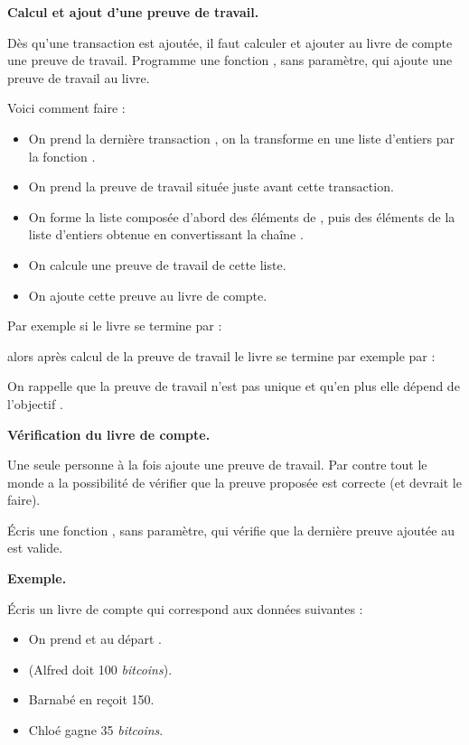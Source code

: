 \documentclass[12pt,class=report,crop=false]{standalone}
\begin{document}
\begin{enumerate}
 
\newpage

 \textbf{Calcul et ajout d'une preuve de travail.}  

Dès qu'une transaction est ajoutée, il faut calculer et ajouter au livre de compte une preuve de travail. Programme une fonction , sans paramètre, qui ajoute une preuve de travail au livre.   
   
Voici comment faire :
  \begin{itemize}
    \item On prend la dernière transaction , on la transforme en une liste d'entiers par la fonction .
    \item On prend la preuve de travail  située juste avant cette transaction.
    \item On forme la liste  composée d'abord des éléments de , puis des éléments de la liste d'entiers obtenue en convertissant la chaîne .
    \item On calcule une preuve de travail de cette liste.
    \item  On ajoute cette preuve au livre de compte.
  \end{itemize}
  Par exemple si le livre se termine par :\\
  \centerline{}
  alors après calcul de la preuve de travail le livre se termine par exemple par :\\
  \centerline{}  
     On rappelle que la preuve de travail n'est pas unique et qu'en plus elle dépend 
   de l'objectif .
   
 \newpage

 \textbf{Vérification du livre de compte.}  
   
Une seule personne à la fois ajoute une preuve de travail. Par contre tout le monde a la possibilité de vérifier que la preuve proposée est correcte (et devrait le faire). 


	Écris une fonction , sans paramètre, qui vérifie que la dernière preuve ajoutée au  est valide.
	
	
	\bigskip
	

\textbf{Exemple.}

Écris un livre de compte qui correspond aux données suivantes :
	\begin{itemize}
	  \item On prend  et au départ .
	  \item {} (Alfred doit 100 \emph{bitcoins}).
	  \item Barnabé en reçoit 150.
	  \item Chloé gagne 35 \emph{bitcoins}.
	\end{itemize}

\end{enumerate} 
\end{document}
